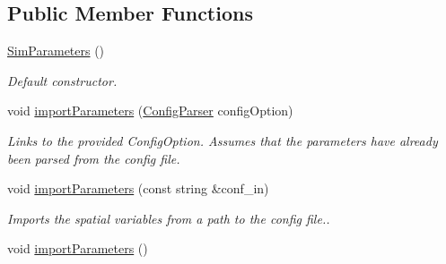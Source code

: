 \subsection*{Public Member Functions}
\begin{DoxyCompactItemize}
\item 
\hyperlink{struct_sim_parameters_aa91bc46ea6909abeeb7488c36da269ee}{Sim\+Parameters} ()\hypertarget{struct_sim_parameters_aa91bc46ea6909abeeb7488c36da269ee}{}\label{struct_sim_parameters_aa91bc46ea6909abeeb7488c36da269ee}

\begin{DoxyCompactList}\small\item\em Default constructor. \end{DoxyCompactList}\item 
void \hyperlink{struct_sim_parameters_a20f9639591099b3a4a0c2fc2b0400dbb}{import\+Parameters} (\hyperlink{class_config_parser}{Config\+Parser} config\+Option)
\begin{DoxyCompactList}\small\item\em Links to the provided Config\+Option. Assumes that the parameters have already been parsed from the config file. \end{DoxyCompactList}\item 
void \hyperlink{struct_sim_parameters_a2c587f1f41e13c51696ca24e5edadc96}{import\+Parameters} (const string \&conf\+\_\+in)
\begin{DoxyCompactList}\small\item\em Imports the spatial variables from a path to the config file.. \end{DoxyCompactList}\item 
void \hyperlink{struct_sim_parameters_a65833f22d1f30997727ed71e989af02e}{import\+Parameters} ()\hypertarget{struct_sim_parameters_a65833f22d1f30997727ed71e989af02e}{}\label{struct_sim_parameters_a65833f22d1f30997727ed71e989af02e}


\end{DoxyCompactItemize}
